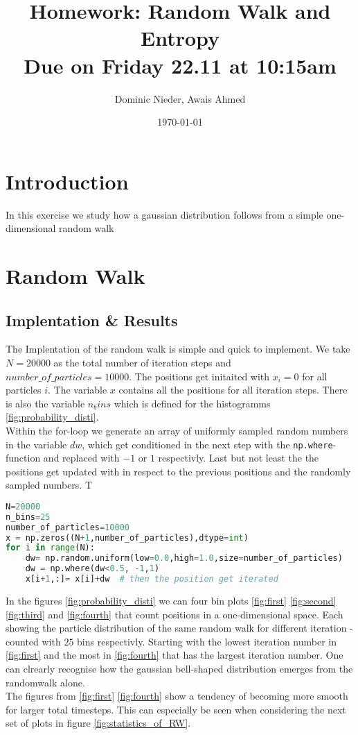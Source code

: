 \documentclass{article}[a4paper]
\title{
    \vspace{2in}
    \textmd{\textbf{Homework: Random Walk and Entropy}}\\
    \normalsize\vspace{0.1in}\small{Due on Friday 22.11 at 10:15am}\\
    \vspace{0.1in}
    \vspace{3in}
}
\author{Dominic Nieder, Awais Ahmed}
\date{\today}
\begin{document}
\section{Introduction}

In this exercise we study how a gaussian distribution follows from a simple one-dimensional random walk

\section{Random Walk}
\subsection{Implentation \& Results}

The Implentation of the random walk is simple and quick to implement. 
We take $N=20000$ as the total number of iteration steps and $number\_of\_particles=10000$. The positions get initaited with $x_i=0$ for all particles $i$. The variable $x$ contains all the positions for all iteration steps. There is also the variable $n_bins$ which is defined for the histogramms \ref{fig:probability_disti}. \\
Within the for-loop we generate an array of uniformly sampled random numbers in the variable $dw$, which get conditioned in the next step with the \texttt{np.where}-function and replaced with $-1$ or $1$ respectivly. Last but not least the the positions get updated with in respect to the previous positions and the randomly sampled numbers. T

\begin{lstlisting}[language=python]
N=20000 
n_bins=25
number_of_particles=10000  
x = np.zeros((N+1,number_of_particles),dtype=int) 
for i in range(N):
    dw= np.random.uniform(low=0.0,high=1.0,size=number_of_particles)  
    dw = np.where(dw<0.5, -1,1)  
    x[i+1,:]= x[i]+dw  # then the position get iterated
\end{lstlisting}

In the figures \ref{fig:probability_disti} we can four bin plots \ref{fig:first} \ref{fig:second} \ref{fig:third} and \ref{fig:fourth} that count positions in a one-dimensional space. Each showing the particle distribution of the same random walk for different iteration - counted with $25$ bins respectivly. Starting with the lowest iteration number in \ref{fig:first} and the most in \ref{fig:fourth} that has the largest iteration number. One can clrearly recognise how the gaussian bell-shaped distribution emerges from the randomwalk alone.  \\
The figures from \ref{fig:first} \ref{fig:fourth} show a tendency of becoming more smooth for larger total timesteps. This can especially be seen when considering the next set of plots in figure \ref{fig:statistics_of_RW}.
\end{document}
